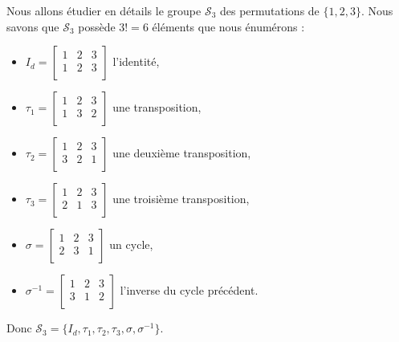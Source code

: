 \documentclass{book}
\begin{document}
Nous allons étudier en détails le groupe $\mathcal{S}_3$ des permutations de $\{1,2,3\}$.
Nous savons que $\mathcal{S}_3$ possède $3!=6$ éléments que nous énumérons :
\begin{itemize}
 \item $I_d = \left[\begin{smallmatrix}
 1 & 2 & 3 \\
 1 & 2 & 3 \\
        \end{smallmatrix} \right]
$ l'identité,

 \item $\tau_1 = \left[\begin{smallmatrix}
 1 & 2 & 3 \\
 1 & 3 & 2 \\
        \end{smallmatrix} \right]
$ une transposition,

 \item $\tau_2 = \left[\begin{smallmatrix}
 1 & 2 & 3 \\
 3 & 2 & 1 \\
        \end{smallmatrix} \right]
$ une deuxième transposition,

 \item $\tau_3 = \left[\begin{smallmatrix}
 1 & 2 & 3 \\
 2 & 1 & 3 \\
        \end{smallmatrix} \right]
$ une troisième transposition,

 \item $\sigma = \left[\begin{smallmatrix}
 1 & 2 & 3 \\
 2 & 3 & 1 \\
        \end{smallmatrix} \right]
$ un cycle,


 \item $\sigma^{-1} = \left[\begin{smallmatrix}
 1 & 2 & 3 \\
 3 & 1 & 2 \\
        \end{smallmatrix} \right]
$ l'inverse du cycle précédent.
\end{itemize}

Donc $\mathcal{S}_3 = \{I_d,\tau_1,\tau_2,\tau_3,\sigma,\sigma^{-1}\}$.
\end{document}
